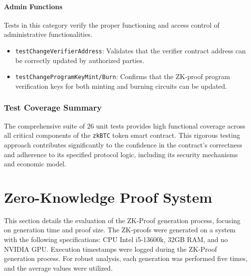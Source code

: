 \documentclass{DESSThesis}
\newcommand{\zktoken}{\texttt{zkBTC}}
\begin{document}
\paragraph{Admin Functions}
Tests in this category verify the proper functioning and access control of administrative functionalities.
\begin{itemize}
    \item \texttt{testChangeVerifierAddress}: Validates that the verifier contract address can be correctly updated by authorized parties.
    \item \texttt{testChangeProgramKeyMint/Burn}: Confirms that the ZK-proof program verification keys for both minting and burning circuits can be updated.
\end{itemize}

\subsubsection{Test Coverage Summary}
The comprehensive suite of 26 unit tests provides high functional coverage across all critical components of the \texttt{\zktoken} token smart contract. This rigorous testing approach contributes significantly to the confidence in the contract's correctness and adherence to its specified protocol logic, including its security mechanisms and economic model.


\section{Zero-Knowledge Proof System}
This section details the evaluation of the ZK-Proof generation process, focusing on generation time and proof size. The ZK-proofs were generated on a system with the following specifications: CPU Intel i5-13600k, 32GB RAM, and no NVIDIA GPU. Execution timestamps were logged during the ZK-Proof generation process. For robust analysis, each generation was performed five times, and the average values were utilized.
\end{document}
